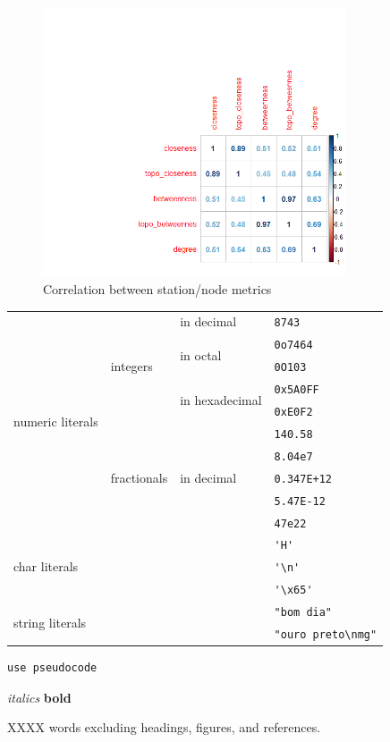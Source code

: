 \documentclass[11pt]{article} %
\begin{document}
\begin{figure}
\centering
\includegraphics[width=0.8\textwidth]{example}
\caption{Correlation between station/node metrics}
\end{figure}

\begin{tabular}{|l|l|l|l|}\hline
  \multirow{10}{*}{numeric literals} 				& \multirow{5}{*}{integers} 	& in decimal 					& \verb|8743| \\ \cline{3-4}
  					    				& 				       	& \multirow{2}{*}{in octal}   		& \verb|0o7464| \\ \cline{4-4}
  					    				& 					& 						& \verb|0O103| \\ \cline{3-4}
  					    				& 					& \multirow{2}{*}{in hexadecimal}	& \verb|0x5A0FF| \\ \cline{4-4}
 				 	    				& 					& 						& \verb|0xE0F2| \\ \cline{2-4}
  					    				& \multirow{5}{*}{fractionals} 	& \multirow{5}{*}{in decimal} 		& \verb|140.58| \\ \cline{4-4}
 				 					& 					& 						& \verb|8.04e7| \\ \cline{4-4}
  									& 					& 						& \verb|0.347E+12| \\ \cline{4-4}
  									& 					& 						& \verb|5.47E-12| \\ \cline{4-4}
  									& 					& 						& \verb|47e22| \\ \cline{1-4}
  \multicolumn{3}{|l|}{\multirow{3}{*}{char literals}} 													& \verb|'H'| \\ \cline{4-4}
  \multicolumn{3}{|l|}{} 																	& \verb|'\n'| \\ \cline{4-4}          %
  \multicolumn{3}{|l|}{} 																	& \verb|'\x65'| \\ \cline{1-4}        %
  \multicolumn{3}{|l|}{\multirow{2}{*}{string literals}} 												& \verb|"bom dia"| \\ \cline{4-4}
  \multicolumn{3}{|l|}{} 																	& \verb|"ouro preto\nmg"| \\ \cline{1-4}          %
\end{tabular}




\begin{verbatim}
use pseudocode
\end{verbatim}

\textit{italics}
\textbf{bold}

XXXX words excluding headings, figures, and references. \\

\nocite{*}

\medskip


\printbibliography
\end{document}
